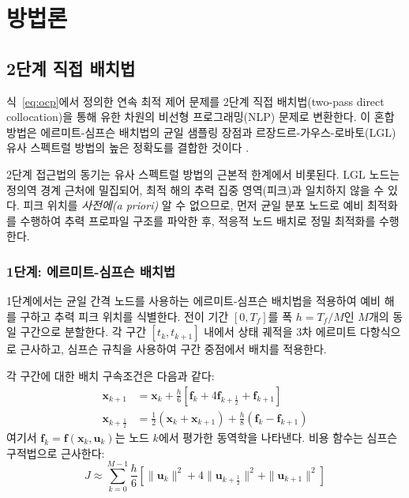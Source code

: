 \section{방법론}\label{sec:methodology}

\subsection{2단계 직접 배치법}\label{subsec:direct_collocation}

식~\eqref{eq:ocp}에서 정의한 연속 최적 제어 문제를 2단계 직접 배치법(two-pass direct collocation)을 통해 유한 차원의 비선형 프로그래밍(NLP) 문제로 변환한다. 이 혼합 방법은 에르미트-심프슨 배치법의 균일 샘플링 장점과 르장드르-가우스-로바토(LGL) 유사 스펙트럴 방법의 높은 정확도를 결합한 것이다 \citep{Hargraves1987,Rao2025,Fahroo2002}.

2단계 접근법의 동기는 유사 스펙트럴 방법의 근본적 한계에서 비롯된다. LGL 노드는 정의역 경계 근처에 밀집되어, 최적 해의 추력 집중 영역(피크)과 일치하지 않을 수 있다. 피크 위치를 \textit{사전에(a priori)} 알 수 없으므로, 먼저 균일 분포 노드로 예비 최적화를 수행하여 추력 프로파일 구조를 파악한 후, 적응적 노드 배치로 정밀 최적화를 수행한다.

\subsubsection{1단계: 에르미트-심프슨 배치법}

1단계에서는 균일 간격 노드를 사용하는 에르미트-심프슨 배치법을 적용하여 예비 해를 구하고 추력 피크 위치를 식별한다. 전이 기간 $[0, T_f]$를 폭 $h = T_f/M$인 $M$개의 동일 구간으로 분할한다. 각 구간 $[t_k, t_{k+1}]$ 내에서 상태 궤적을 3차 에르미트 다항식으로 근사하고, 심프슨 규칙을 사용하여 구간 중점에서 배치를 적용한다.

각 구간에 대한 배치 구속조건은 다음과 같다:
\begin{align}
\mathbf{x}_{k+1} &= \mathbf{x}_k + \frac{h}{6}\left[\mathbf{f}_k + 4\mathbf{f}_{k+\frac{1}{2}} + \mathbf{f}_{k+1}\right] \label{eq:simpson_continuity} \\
\mathbf{x}_{k+\frac{1}{2}} &= \frac{1}{2}(\mathbf{x}_k + \mathbf{x}_{k+1}) + \frac{h}{8}(\mathbf{f}_k - \mathbf{f}_{k+1}) \label{eq:hermite_midpoint}
\end{align}
여기서 $\mathbf{f}_k = \mathbf{f}(\mathbf{x}_k, \mathbf{u}_k)$는 노드 $k$에서 평가한 동역학을 나타낸다. 비용 함수는 심프슨 구적법으로 근사한다:
\begin{equation}
J \approx \sum_{k=0}^{M-1} \frac{h}{6}\left[\|\mathbf{u}_k\|^2 + 4\|\mathbf{u}_{k+\frac{1}{2}}\|^2 + \|\mathbf{u}_{k+1}\|^2\right]
\end{equation}


